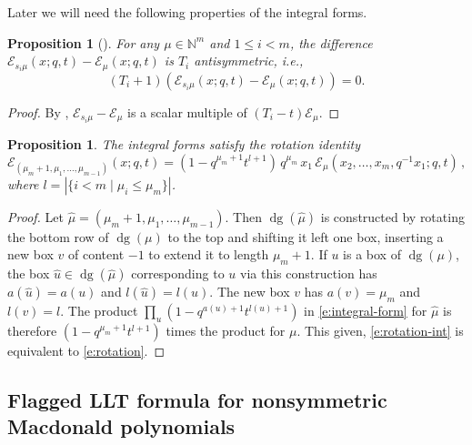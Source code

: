 \documentclass[12pt]{amsart}
\newtheorem{prop}[thm]{Proposition}
\theoremstyle{definition}
\theoremstyle{remark}
\newcommand{\NN}{{\mathbb N}}
\newcommand{\Ecal}{{\mathcal E}}
\newcommand{\uhat}{\widehat{u}}
\newcommand{\muhat}{\widehat{\mu }}
\DeclareMathOperator{\dg}{dg}
\begin{document}
Later we will need the following properties of the integral forms.

\begin{prop}[\cite{Knop07}]\label{prop:Knop-antisymmetry}
For any $\mu \in \NN ^{m}$ and $1\leq i<m$, the difference $\Ecal
_{s_{i} \mu }(x;q,t) - \Ecal _{\mu }(x;q,t)$ is $T_{i}$ antisymmetric,
i.e.,
\begin{equation}\label{e:Knop-antisymmetry}
(T_{i}+1) (\Ecal _{s_{i} \mu }(x;q,t) - \Ecal _{\mu }(x;q,t)) = 0.
\end{equation}
\end{prop}

\begin{proof}
By \cite[Lemma~11.5]{Knop07}, $\Ecal _{s_{i}\mu } - \Ecal _{\mu }$
is a scalar multiple of $(T_{i}-t)\Ecal _{\mu }$.
\end{proof}

\begin{prop}\label{prop:rotation-int}
The integral forms satisfy the  rotation
identity
\begin{equation}\label{e:rotation-int}
\Ecal _{(\mu _{m}+1,\mu _{1},\ldots,\mu _{m-1})}(x;q,t) = (1-q^{\mu
_{m}+1} t^{l+1})\, q^{\mu _{m}}\, x_{1}\, \Ecal _{\mu
}(x_{2},\ldots,x_{m},q^{-1} x_{1}; q,t)\, ,
\end{equation}
where $l = |\{i<m \mid \mu _{i}\leq \mu _{m} \}|$.
\end{prop}

\begin{proof}
Let $\muhat = (\mu _{m}+1,\mu _{1},\ldots,\mu _{m-1})$.  Then $\dg
(\muhat )$ is constructed by rotating the bottom row of $\dg (\mu )$
to the top and shifting it left one box, inserting a new box $v$ of
content $-1$ to extend it to length $\mu _{m}+1$.  If $u$ is a box of
$\dg (\mu )$, the box $\uhat \in \dg (\muhat )$ corresponding to $u$
via this construction has $a(\uhat ) = a(u)$ and $l(\uhat ) = l(u)$.
The new box $v$ has $a(v) = \mu _{m}$ and $l(v) = l$.  The product
$\prod _{u}(1-q^{a(u)+1} t^{l(u)+1})$ in \eqref{e:integral-form} for
$\muhat $ is therefore $(1 - q^{\mu _{m}+1}t^{l+1})$ times the product
for $\mu $.  This given, \eqref{e:rotation-int} is equivalent to
\eqref{e:rotation}.
\end{proof}


\subsection{Flagged LLT formula for nonsymmetric Macdonald
polynomials}
\label{ss:ns-HHL}
\end{document}
